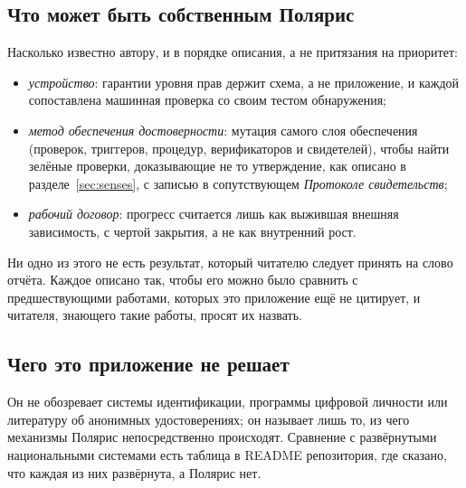\subsection{Что может быть собственным Полярис}

Насколько известно автору, и в порядке описания, а не притязания на приоритет:
\begin{itemize}
  \item \emph{устройство}: гарантии уровня прав держит схема, а не приложение, и каждой сопоставлена
    машинная проверка со своим тестом обнаружения;
  \item \emph{метод обеспечения достоверности}: мутация самого слоя обеспечения (проверок, триггеров,
    процедур, верификаторов и свидетелей), чтобы найти зелёные проверки, доказывающие не то
    утверждение, как описано в разделе~\ref{sec:senses}, с записью в сопутствующем \emph{Протоколе свидетельств};
  \item \emph{рабочий договор}: прогресс считается лишь как выжившая внешняя зависимость, с чертой
    закрытия, а не как внутренний рост.
\end{itemize}
Ни одно из этого не есть результат, который читателю следует принять на слово отчёта. Каждое
описано так, чтобы его можно было сравнить с предшествующими работами, которых это приложение ещё не
цитирует, и читателя, знающего такие работы, просят их назвать.

\subsection{Чего это приложение не решает}

Он не обозревает системы идентификации, программы цифровой личности или литературу об анонимных
удостоверениях; он называет лишь то, из чего механизмы Полярис непосредственно происходят. Сравнение
с развёрнутыми национальными системами есть таблица в README репозитория, где сказано, что каждая
из них развёрнута, а Полярис нет.
